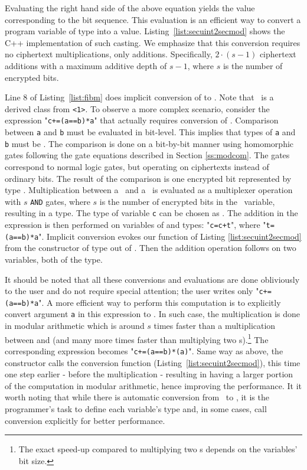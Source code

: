 Evaluating the right hand side of the above equation yields the value corresponding to the bit sequence. This evaluation is an efficient way to convert a program variable of type \secuint{} into a \secmod{} value.
Listing~\ref{list:secuint2secmod} shows the C++ implementation of such casting.
We emphasize that this conversion requires no ciphertext multiplications, only additions. Specifically, $2 \cdot (s - 1)$ ciphertext additions with a maximum additive depth of $s-1$, where $s$ is the number of encrypted bits.




Line 8 of Listing~\ref{list:fibm} does implicit conversion of \secbool{} to \secmod{}. Note that \secbool\ is a derived class from \secuint\texttt{<1>}. To observe a more complex scenario, consider the expression "{\tt{}c+=(a==b)*a}" that actually requires conversion of \secuint{}.
Comparison between \texttt{a} and \texttt{b} must be evaluated in bit-level. This implies that types of \texttt{a} and \texttt{b} must be \secuint{}. The comparison is done on a bit-by-bit manner using homomorphic gates following the gate equations described in Section \ref{ss:modcom}.
The gates correspond to normal logic gates, but operating on ciphertexts instead of ordinary bits. The result of the comparison is one encrypted bit represented by type \secbool.
Multiplication between a \secbool\ and a \secuint\ is evaluated as a multiplexer operation with $s$ \texttt{AND} gates, where $s$ is the number of encrypted bits in the \secuint\ variable, resulting in a \secuint{} type.
The type of variable \texttt{c} can be chosen as \secmod{}. The addition in the expression is then performed on variables of \secmod{} and \secuint{} types: "{\tt{}c=c+t}", where "{\tt{}t=(a==b)*a}". Implicit conversion evokes our function of Listing \ref{list:secuint2secmod} from the constructor of \secmod{} type out of \secuint{}.
Then the addition operation follows on two variables, both of the \secmod{} type.

It should be noted that all these conversions and evaluations are done obliviously to the user and do not require special attention; the user writes only "{\tt{}c+=(a==b)*a}".
A more efficient way to perform this computation is to explicitly convert argument \texttt{a}  in this expression to \secmod. In such case, the multiplication is done in modular arithmetic which is around $s$ times faster than a multiplication between \secbool{} and \secuint{} (and many more times faster than multiplying two \secuint{}s).\footnote{The exact speed-up compared to multiplying two \secuint s depends on the variables' bit size.} The corresponding expression becomes \mbox{"{\tt{}c+=(a==b)*\secmod(a)}"}.
Same way as above, the constructor calls the conversion function (Listing~\ref{list:secuint2secmod}), this time one step earlier - before the multiplication - resulting in having a larger portion of the computation in modular arithmetic, hence improving the performance.
It it worth noting that while there is automatic conversion from \secuint\ to \secmod, it is the programmer's task to define each variable's type and, in some cases, call conversion explicitly for better performance.

